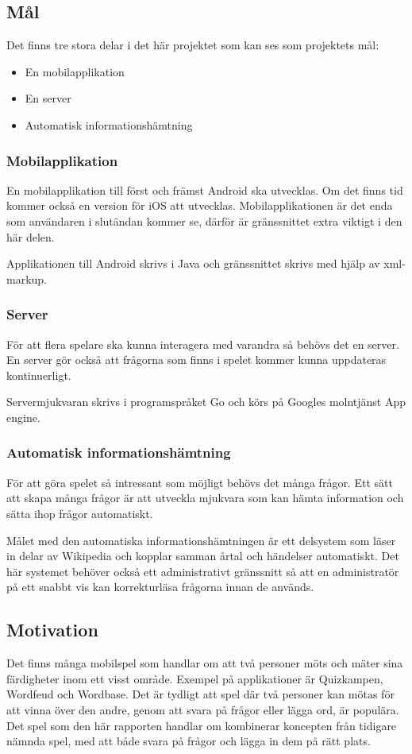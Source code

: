 \documentclass[swedish,12pt,a4paper]{article}
\begin{document}
\subsection{Mål}
Det finns tre stora delar i det här projektet som kan ses som projektets mål:
\begin{itemize}
\item En mobilapplikation
\item En server
\item Automatisk informationshämtning
\end{itemize}

\subsubsection{Mobilapplikation}
En mobilapplikation till först och främst Android ska utvecklas. Om det finns tid kommer också en version för iOS att utvecklas. Mobilapplikationen är det enda som användaren i slutändan kommer se, därför är gränssnittet extra viktigt i den här delen. 

Applikationen till Android skrivs i Java och gränssnittet skrivs med hjälp av xml-markup.
\subsubsection{Server}
För att flera spelare ska kunna interagera med varandra så behövs det en server. En server gör också att frågorna som finns i spelet kommer kunna uppdateras kontinuerligt.

Servermjukvaran skrivs i programspråket Go och körs på Googles molntjänst App engine.

\subsubsection{Automatisk informationshämtning}
För att göra spelet så intressant som möjligt behövs det många frågor. Ett sätt att skapa många frågor är att utveckla mjukvara som kan hämta information och sätta ihop frågor automatiskt. 

Målet med den automatiska informationshämtningen är ett delsystem som läser in delar av Wikipedia och kopplar samman årtal och händelser automatiskt. Det här systemet behöver också ett administrativt gränssnitt så att en administratör på ett snabbt vis kan korrekturläsa frågorna innan de används.
\subsection{Motivation}
Det finns många mobilspel som handlar om att två personer möts och mäter sina färdigheter inom ett visst område. Exempel på applikationer är Quizkampen, Wordfeud och Wordbase. Det är tydligt att spel där två personer kan mötas för att vinna över den andre, genom att svara på frågor eller lägga ord, är populära. Det spel som den här rapporten handlar om kombinerar koncepten från tidigare nämnda spel, med att både svara på frågor och lägga in dem på rätt plats. 
\end{document}

